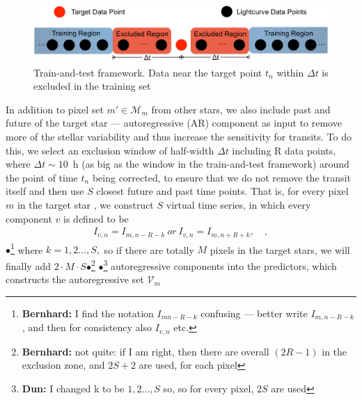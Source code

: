 \documentclass[12pt, preprint]{aastex}
\newcommand{\set}[1]{\mathcal{#1}}
\newcommand{\Bernhard}[1]{$\bullet$\footnote{{\bf Bernhard:} #1}}
\newcommand{\Dun}[1]{$\bullet$\footnote{{\bf Dun:} #1}}
\begin{document}
\begin{figure}[htb]
\centering
\includegraphics[width=0.8\columnwidth]{train_and_test}
\caption{\label{train-and-test} Train-and-test framework. Data near the target point $t_{n}$ within $\Delta t$ is excluded in the training set}
\end{figure}

In addition to pixel set $m'\in\set{M}_m$ from other stars,  
  we also include past and future of the target star --- autoregressive (AR) component as input 
  to remove more of the stellar variability and thus increase the sensitivity for transits. 
To do this, we select an exclusion window of half-width $\Delta t$ including R data points, 
  where $\Delta t\sim 10$\, h (as big as the window in the train-and-test framework) 
  around the point of time $t_{n}$ being corrected, 
  to ensure that we do not remove the transit itself and then use $S$ closest future and past time points. 
That is, for every pixel $m$ in the target star , we construct $S$ virtual time series, 
  in which every component $v$ is defined to be     
\begin{eqnarray}
I_{v,n} = I_{m,n-R-k}\ or\ I_{v,n} = I_{m,n+R+k},
\quad,
\end{eqnarray}
\Bernhard{I find the notation $I_{mn-R-k}$ confusing --- better write $I_{m,n-R-k}$, and then for consistency also $I_{v,n}$ etc.}
where $k = 1, 2\dots, S,$ so if there are totally $M$ pixels in the target stars, 
  we will finally add $2\cdot M\cdot S$\Bernhard{not quite: if I am right, then there are overall $(2R-1)$ in the exclusion zone, and $2S+2$ are used, for each pixel} \Dun{I changed k to be $1,2\dots, S$ so, so for every pixel, $2S$ are used} 
  autoregressive components into the predictors, which constructs the autoregressive set $\set{V}_m$
\end{document}
